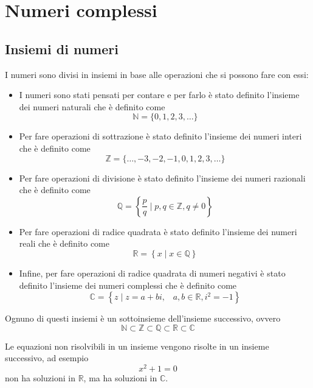 \documentclass[a4paper]{article}
\theoremstyle{break}
\theoremstyle{break}
\theoremstyle{break}
\theoremstyle{break}
\begin{document}


\tableofcontents
\pagebreak


\section{Numeri complessi}
\subsection{Insiemi di numeri}
I numeri sono divisi in insiemi in base alle operazioni che si possono fare con essi:
\begin{itemize}
  \item
    I numeri sono stati pensati per contare e per farlo è stato definito l'insieme dei numeri naturali
    che è definito come \[  \mathbb{N} = \{0, 1, 2, 3, \ldots\} \]
  \item
    Per fare operazioni di sottrazione è stato definito l'insieme dei numeri interi che è
    definito come \[ \mathbb{Z} = \{\ldots, -3, -2, -1, 0, 1, 2, 3, \ldots\} \]
  \item
    Per fare operazioni di divisione è stato definito l'insieme dei numeri razionali che è
    definito come \[ \mathbb{Q} = \left\{ \frac{p}{q} \mid p, q \in \mathbb{Z}, q \neq 0 \right\} \]
  \item
    Per fare operazioni di radice quadrata è stato definito l'insieme dei numeri reali che è
    definito come \[ \mathbb{R} = \left\{ x \mid x \in \mathbb{Q} \right\} \]
  \item
    Infine, per fare operazioni di radice quadrata di numeri negativi è stato definito
    l'insieme dei numeri complessi che è definito come
    \[ \mathbb{C} = \left\{ z \mid z = a + bi,\;\;\; a, b \in \mathbb{R}, i^2 = -1 \right\} \]
\end{itemize}

\noindent Ognuno di questi insiemi è un sottoinsieme dell'insieme successivo, ovvero
\[ \mathbb{N} \subset \mathbb{Z} \subset \mathbb{Q} \subset \mathbb{R} \subset \mathbb{C} \]

\noindent Le equazioni non risolvibili in un insieme vengono risolte in un insieme successivo, ad esempio
\[ x^2 + 1 = 0 \] non ha soluzioni in $\mathbb{R}$, ma ha soluzioni in $\mathbb{C}$.
\end{document}
